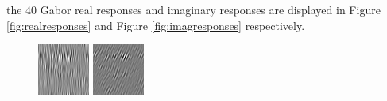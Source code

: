 the 40 Gabor real responses and imaginary responses are displayed in \mbox{Figure} \ref{fig:realresponses} and \mbox{Figure} \ref{fig:imagresponses} respectively.
\begin{figure}[ht]
 \begin{center}
  \includegraphics[width=\columnwidth/9]{ch4/figures/real_-1_0.jpg}
  \includegraphics[width=\columnwidth/9]{ch4/figures/real_-1_1.jpg}

\end{center}
\end{figure}
